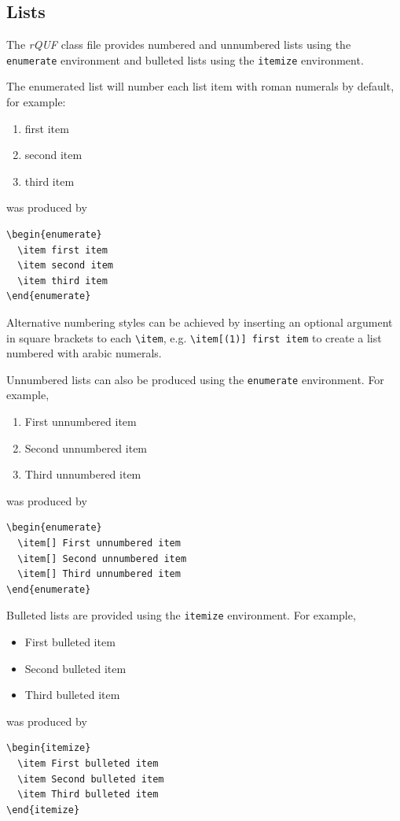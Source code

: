 \documentclass{rQUF2e}
\theoremstyle{plain}
\theoremstyle{definition}
\theoremstyle{remark}
\begin{document}
\subsection{Lists}

The \textit{rQUF} class file provides numbered and unnumbered lists using the \texttt{enumerate} environment and bulleted lists using the \texttt{itemize} environment.

The enumerated list will number each list item with roman numerals by default, for example:
\begin{enumerate}
  \item first item
  \item second item
  \item third item
\end{enumerate}
was produced by
\begin{verbatim}
\begin{enumerate}
  \item first item
  \item second item
  \item third item
\end{enumerate}
\end{verbatim}
Alternative numbering styles can be achieved by inserting an optional argument in square brackets to each \verb"\item", e.g. \verb"\item[(1)] first item" to create a list numbered with arabic numerals.

Unnumbered lists can also be produced using the \texttt{enumerate} environment. For example,
\begin{enumerate}
  \item[] First unnumbered item
  \item[] Second unnumbered item
  \item[] Third unnumbered item
\end{enumerate}
was produced by
\begin{verbatim}
\begin{enumerate}
  \item[] First unnumbered item
  \item[] Second unnumbered item
  \item[] Third unnumbered item
\end{enumerate}
\end{verbatim}

Bulleted lists are provided using the \texttt{itemize} environment. For example,
\begin{itemize}
  \item First bulleted item
  \item Second bulleted item
  \item Third bulleted item
\end{itemize}
was produced by
\begin{verbatim}
\begin{itemize}
  \item First bulleted item
  \item Second bulleted item
  \item Third bulleted item
\end{itemize}
\end{verbatim}
\end{document}
